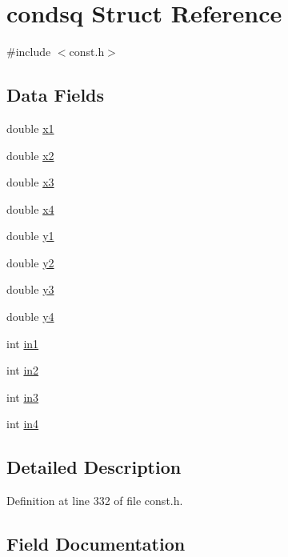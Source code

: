 \hypertarget{structcondsq}{}\section{condsq Struct Reference}
\label{structcondsq}


{\ttfamily \#include $<$const.\+h$>$}

\subsection*{Data Fields}
\begin{DoxyCompactItemize}
\item 
double \hyperlink{structcondsq_ac75b803b570527306e1e744bfb7a604f}{x1}
\item 
double \hyperlink{structcondsq_adcf04f5f1964d18b332643939561da0d}{x2}
\item 
double \hyperlink{structcondsq_a98e99f64ddf7321e4eae52beca4b580f}{x3}
\item 
double \hyperlink{structcondsq_aeeabbbab3ba9e1ce2ac2251cb07158cc}{x4}
\item 
double \hyperlink{structcondsq_ac3b72e5b77595ca2340ecf8ccfe5fd99}{y1}
\item 
double \hyperlink{structcondsq_a5347e514ebe985fb371754ffd2b5ff83}{y2}
\item 
double \hyperlink{structcondsq_a786634d3d364cf94d8eb600ce7136355}{y3}
\item 
double \hyperlink{structcondsq_aa27494b0c52727c9b56afe76f9aff13f}{y4}
\item 
int \hyperlink{structcondsq_a774ddc65536ce3a5cacc80197ade1d28}{in1}
\item 
int \hyperlink{structcondsq_a291f7ca3921946eaa5aa1b4b2218c081}{in2}
\item 
int \hyperlink{structcondsq_a0317c615b473f941166fb655fbfacab8}{in3}
\item 
int \hyperlink{structcondsq_aaf16c716fbcf452c1feef9dc6a3b7322}{in4}
\end{DoxyCompactItemize}


\subsection{Detailed Description}


Definition at line 332 of file const.\+h.



\subsection{Field Documentation}
\hypertarget{structcondsq_a774ddc65536ce3a5cacc80197ade1d28}{}
